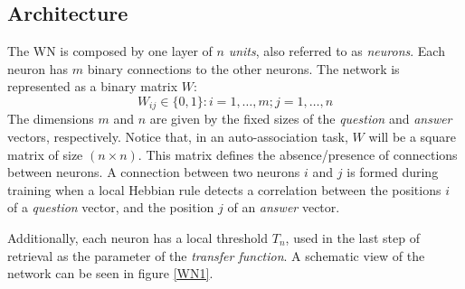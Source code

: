 \documentclass[runningheads]{llncs}
\begin{document}
\subsection{Architecture}
\label{sec:wn_arch}
The WN is composed by one layer of $n$  \textit{units}, also referred to as \textit{neurons}. Each neuron has $m$ binary connections to the other neurons.
The network is represented as a binary matrix $W$:
\begin{equation}
W_{ij} \in \{0,1\} : i=1, \ldots, m ;  j=1, \ldots, n
\end{equation}
The dimensions $m$ and $n$ are given by the fixed sizes of the \textit{question} and \textit{answer} vectors, respectively. Notice that, in an auto-association task, $W$ will be a square matrix of size $(n \times n)$. 
This matrix defines the absence/presence of connections between neurons. A connection between two neurons $i$ and $j$ is formed during training when a local Hebbian rule detects a correlation between the positions $i$ of a \textit{question} vector, and the position $j$ of an \textit{answer} vector.

Additionally, each neuron has a local threshold $T_n$, used in the last step of retrieval as the parameter of the \textit{transfer function}. A schematic view of the network can be seen in figure \ref{WN1}.
\end{document}
